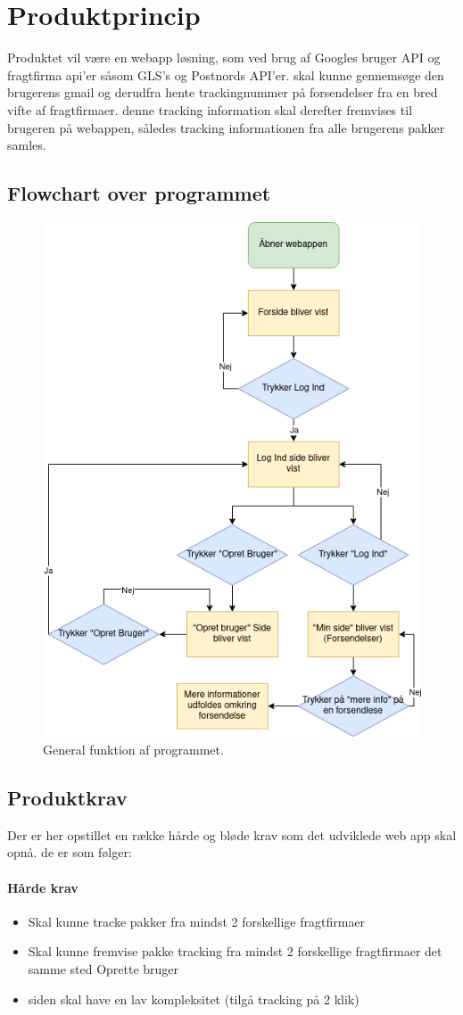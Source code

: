 \chapter{Produktprincip}
Produktet vil være en webapp løsning, som ved brug af Googles bruger API og fragtfirma 
api'er såsom GLS's og Postnords API'er. skal kunne gennemsøge den brugerens gmail og 
derudfra hente trackingnummer på forsendelser fra en bred vifte af fragtfirmaer. denne 
tracking information skal derefter fremvises til brugeren på webappen, således tracking 
informationen fra alle brugerens pakker samles.
\section{Flowchart over programmet}
\begin{figure}[h]
    \includegraphics[width=0.5\linewidth]{Pictures/flowchat-main.png}
    \centering
    \caption{General funktion af programmet.}
     \label{fig:Flowchat}
  \end{figure}
  

\section{Produktkrav}
Der er her opstillet en række hårde og bløde krav som det udviklede web app skal opnå. de er som følger:

\subsubsection{Hårde krav}
\begin{itemize}
    \item Skal kunne tracke pakker fra mindst 2 forskellige fragtfirmaer
    \item Skal kunne fremvise pakke tracking fra mindst 2 forskellige fragtfirmaer det samme sted
    Oprette bruger
    \item siden skal have en lav kompleksitet (tilgå tracking på 2 klik)
\end{itemize}


